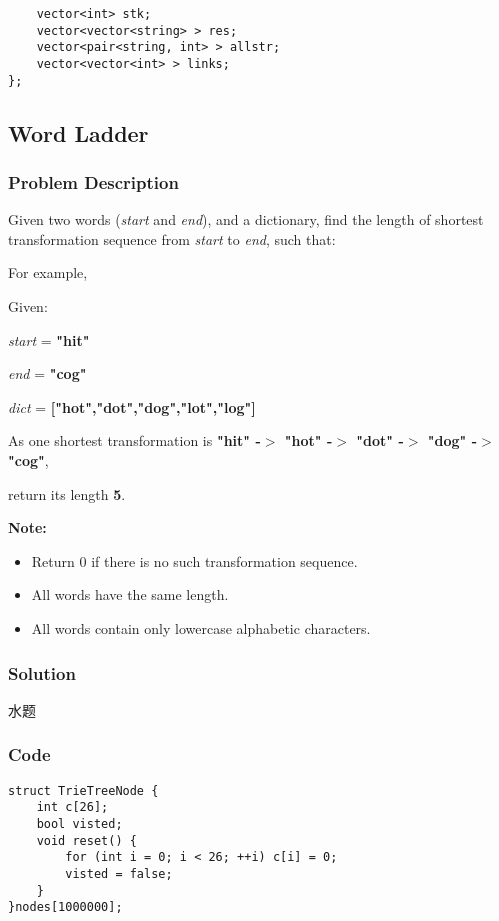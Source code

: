 \documentclass[courier]{article}
\begin{document}
\begin{CJK*}{UTF8}{gkai}
\begin{lstlisting}
    vector<int> stk;
    vector<vector<string> > res;
    vector<pair<string, int> > allstr;
    vector<vector<int> > links;
}; 
\end{lstlisting}


\subsection{ Word Ladder }

\subsubsection*{Problem Description}
Given two words (\emph{start} and \emph{end}), and a dictionary, find the length of shortest transformation sequence from \emph{start} to \emph{end}, such that:

For example,

Given:


\emph{start} = \textbf{"hit"}


\emph{end} = \textbf{"cog"}


\emph{dict} = \textbf{["hot","dot","dog","lot","log"]}

As one shortest transformation is \textbf{"hit" -$>$ "hot" -$>$ "dot" -$>$ "dog" -$>$ "cog"},


return its length \textbf{5}.

\textbf{Note:}



\begin{itemize}
\item Return 0 if there is no such transformation sequence.
\item All words have the same length.
\item All words contain only lowercase alphabetic characters.
\end{itemize}



\subsubsection*{Solution}
水题

\subsubsection*{Code}
\begin{lstlisting}
struct TrieTreeNode {
    int c[26];
    bool visted;
    void reset() {
        for (int i = 0; i < 26; ++i) c[i] = 0;
        visted = false;
    }
}nodes[1000000];


\end{lstlisting}
\end{CJK*}
\end{document}
